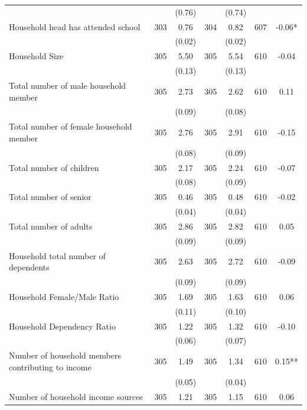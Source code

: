 \begin{tabular}{@{\extracolsep{5pt}}lcccccc}
 &   & (0.76)  &   & (0.74)  &   &  \\ [1ex]
Household head has attended school   & 303    & 0.76    & 304    & 0.82    & 607    & -0.06*   \\
 &   & (0.02)  &   & (0.02)  &   &  \\ [1ex]
Household Size   & 305    & 5.50    & 305    & 5.54    & 610    & -0.04   \\
 &   & (0.13)  &   & (0.13)  &   &  \\ [1ex]
Total number of male household member   & 305    & 2.73    & 305    & 2.62    & 610    & 0.11   \\
 &   & (0.09)  &   & (0.08)  &   &  \\ [1ex]
Total number of female household member   & 305    & 2.76    & 305    & 2.91    & 610    & -0.15   \\
 &   & (0.08)  &   & (0.09)  &   &  \\ [1ex]
Total number of children   & 305    & 2.17    & 305    & 2.24    & 610    & -0.07   \\
 &   & (0.08)  &   & (0.09)  &   &  \\ [1ex]
Total number of senior   & 305    & 0.46    & 305    & 0.48    & 610    & -0.02   \\
 &   & (0.04)  &   & (0.04)  &   &  \\ [1ex]
Total number of adults   & 305    & 2.86    & 305    & 2.82    & 610    & 0.05   \\
 &   & (0.09)  &   & (0.09)  &   &  \\ [1ex]
Household total number of dependents   & 305    & 2.63    & 305    & 2.72    & 610    & -0.09   \\
 &   & (0.09)  &   & (0.09)  &   &  \\ [1ex]
Household Female/Male Ratio   & 305    & 1.69    & 305    & 1.63    & 610    & 0.06   \\
 &   & (0.11)  &   & (0.10)  &   &  \\ [1ex]
Household Dependency Ratio   & 305    & 1.22    & 305    & 1.32    & 610    & -0.10   \\
 &   & (0.06)  &   & (0.07)  &   &  \\ [1ex]
Number of household members contributing to income   & 305    & 1.49    & 305    & 1.34    & 610    & 0.15**   \\
 &   & (0.05)  &   & (0.04)  &   &  \\ [1ex]
Number of household income sources   & 305    & 1.21    & 305    & 1.15    & 610    & 0.06   \\

\end{tabular}
